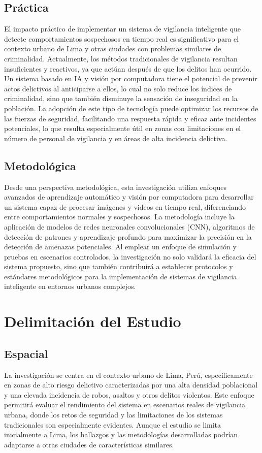 \documentclass[listof=nochaptergap,12pt,times,authoryear]{report}
\begin{document}
\section{Práctica}
El impacto práctico de implementar un sistema de vigilancia inteligente que detecte comportamientos sospechosos en tiempo real es significativo para el contexto urbano de Lima y otras ciudades con problemas similares de criminalidad. Actualmente, los métodos tradicionales de vigilancia resultan insuficientes y reactivos, ya que actúan después de que los delitos han ocurrido. Un sistema basado en IA y visión por computadora tiene el potencial de prevenir actos delictivos al anticiparse a ellos, lo cual no solo reduce los índices de criminalidad, sino que también disminuye la sensación de inseguridad en la población. La adopción de este tipo de tecnología puede optimizar los recursos de las fuerzas de seguridad, facilitando una respuesta rápida y eficaz ante incidentes potenciales, lo que resulta especialmente útil en zonas con limitaciones en el número de personal de vigilancia y en áreas de alta incidencia delictiva.

\section{Metodológica}
Desde una perspectiva metodológica, esta investigación utiliza enfoques avanzados de aprendizaje automático y visión por computadora para desarrollar un sistema capaz de procesar imágenes y videos en tiempo real, diferenciando entre comportamientos normales y sospechosos. La metodología incluye la aplicación de modelos de redes neuronales convolucionales (CNN), algoritmos de detección de patrones y aprendizaje profundo para maximizar la precisión en la detección de amenazas potenciales. Al emplear un enfoque de simulación y pruebas en escenarios controlados, la investigación no solo validará la eficacia del sistema propuesto, sino que también contribuirá a establecer protocolos y estándares metodológicos para la implementación de sistemas de vigilancia inteligente en entornos urbanos complejos.





\chapter{Delimitación del Estudio}
\section{Espacial}
La investigación se centra en el contexto urbano de Lima, Perú, específicamente en zonas de alto riesgo delictivo caracterizadas por una alta densidad poblacional y una elevada incidencia de robos, asaltos y otros delitos violentos. Este enfoque permitirá evaluar el rendimiento del sistema en escenarios reales de vigilancia urbana, donde los retos de seguridad y las limitaciones de los sistemas tradicionales son especialmente evidentes. Aunque el estudio se limita inicialmente a Lima, los hallazgos y las metodologías desarrolladas podrían adaptarse a otras ciudades de características similares.
\end{document}
